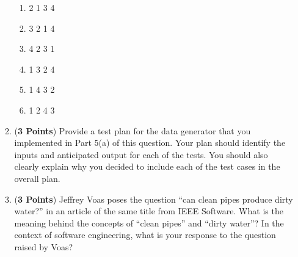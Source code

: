 \documentclass[12pt,epsf,psfig,graphics]{article}
\begin{document}
\begin{enumerate}
\begin{enumerate}
    \begin{enumerate}

    \item 2 1 3 4
      
    \item 3 2 1 4

    \item 4 2 3 1

    \item 1 3 2 4
        
    \item 1 4 3 2

    \item 1 2 4 3

  \end{enumerate}

  \item ({\bf 3 Points}) Provide a test plan for the data generator
    that you implemented in Part 5(a) of this question.  Your plan
    should identify the inputs and anticipated output for each of the
    tests.  You should also clearly explain why you decided to include
    each of the test cases in the overall plan.

  \item ({\bf 3 Points}) Jeffrey Voas poses the question ``can clean
    pipes produce dirty water?'' in an article of the same title from
    IEEE Software.  What is the meaning behind the concepts of ``clean
    pipes'' and ``dirty water''?  In the context of software
    engineering, what is your response to the question raised by Voas?

\end{enumerate}

\end{enumerate}
\end{document}

